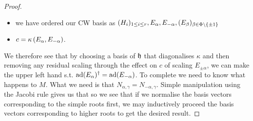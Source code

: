 \documentclass{article}
\begin{document}
\begin{proof}
\begin{itemize}
	\item we have ordered our CW basis as $(H_i)_{1 \leq i \leq r}, E_\alpha,E_{-\alpha}, (E_\beta)_{\beta \in \Phi \setminus \left\{ \pm 1 \right\}}$
	\item $c= \kappa\left( E_\alpha,E_{-\alpha} \right)$.
\end{itemize}
We therefore see that by choosing a basis of $\mathfrak{h}$ that diagonalises $\kappa$ and then removing any residual scaling through the effect on $c$ of scaling $E_{\pm \alpha}$, we can make the upper left hand s.t. $\operatorname{ad}(E_\alpha)^\dagger = \operatorname{ad}(E_{-\alpha})$. To complete we need to know what happens to $M$. What we need is that $N_{\alpha,\gamma} = N_{-\alpha,\gamma}$. Simple manipulation using the Jacobi rule gives us that 
so we see that if we normalise the basis vectors corresponding to the simple roots first, we may inductively proceed the basis vectors corresponding to higher roots to get the desired result. 
	\begin{comment}
	Recall we define the Hermitian conjugate as a dual wrt the inner product we have, which in this case is the Killing form. Explicitly, we define $\ad(E_\alpha)^\dagger$ by 
	\eq{
\forall X,Y \in \mf{g}, \quad \kappa \pround{\ad(E_\alpha)X,Y} = \kappa\pround{X,\ad(E_\alpha)^\dagger Y}	
}
However the ad-invariance of the Killing form means that 
\eq{
\forall X,Y \in \mf{g}, \quad \kappa \pround{\ad(E_\alpha)X,Y} = - \kappa \pround{X,\ad(E_\alpha)Y}
}
Due to the non-degeneracy of $\kappa$ to complete the proof we need only show that $\ad(E_{-\alpha})$ is a candidate. \hl{solve this problem}
\end{comment}
\end{proof}
\end{document}

